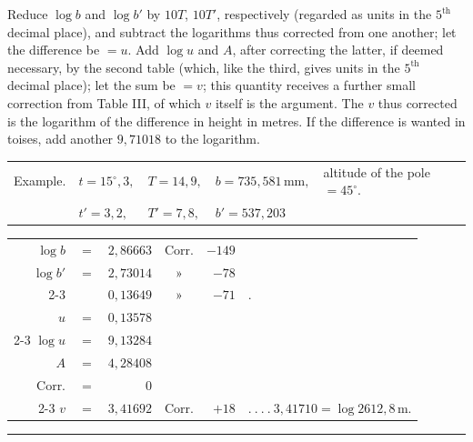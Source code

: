 \par\noindent\hspace*{\parindent}Reduce $\log b$ and $\log b'$ by $10T$, $10T'$, respectively (regarded as units in the $5^{\mathrm{th}}$ decimal place), and subtract the logarithms thus corrected from one another; let the difference be $=u$. Add $\log u$ and $A$, after correcting the latter, if deemed necessary, by the second table (which, like the third, gives units in the $5^{\mathrm{th}}$ decimal place); let the sum be $=v$; this quantity receives a further small correction from Table III, of which $v$ itself is the argument. The $v$ thus corrected is the logarithm of the difference in height in metres. If the difference is wanted in toises, add another $9{,}71018$ to the logarithm.
\par\medskip
\noindent\hspace*{.5em}\begin{tabular}{l@{\quad}l@{\quad}l@{\quad}l@{\quad}l}
Example.&$t=15^\circ{,}3,$&$T=14{,}9,$&$b=735{,}581\,\mathrm{mm},$&altitude of the pole $=45^\circ$.\\
&$t'=3{,}2,$&$T'=7{,}8,$&$b'=537{,}203$&
\end{tabular}
\par\noindent\hspace*{1.5cm}\begingroup\setlength{\tabcolsep}{2pt}\renewcommand{\arraystretch}{1.2}
\begin{tabular}{r@{\ }c@{\ }r@{\quad}c@{\ }r@{\ }l}
$\log b$&$=$&$2{,}86663$&Corr.&$-149$&\\
$\log b'$&$=$&$2{,}73014$&»&$-78$&\\\cline{2-3}\cline{5-5}
&&$0{,}13649$&»&$-71$&\qquad .\\
$u$&$=$&$0{,}13578$&&&\\\cline{2-3}
$\log u$&$=$&$9{,}13284$&&&\\
$A$&$=$&$4{,}28408$&&&\\
Corr.&$=$&$0$&&&\\\cline{2-3}
$v$&$=$&$3{,}41692$&Corr.&$+18$&$.\ .\ .\ .\ 3{,}41710=\log2612{,}8\,\mathrm{m}.$
\end{tabular}\endgroup
\begin{center}\rule{3.5cm}{.4pt}\end{center}

